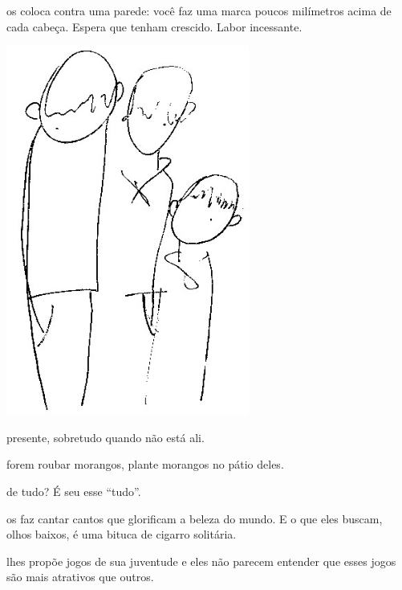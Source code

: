  os coloca contra uma parede: você faz uma marca poucos milímetros
acima de cada cabeça. Espera que tenham crescido. Labor incessante.

\pagebreak
\thispagestyle{empty}

\begin{vplace}[.50]
\begin{center}
\includegraphics[width=80mm]{./imgs/Image_6.jpg}
\end{center}
\end{vplace}

\pagebreak
\thispagestyle{empty}
\movetooddpage

 presente, sobretudo quando não está ali.



 forem roubar morangos, plante morangos no pátio deles.



 de tudo? É seu esse ``tudo''.



 os faz cantar cantos que glorificam a beleza do mundo. E o que eles
buscam, olhos baixos, é uma bituca de cigarro solitária.



 lhes propõe jogos de sua juventude e eles não parecem entender que
esses jogos são mais atrativos que outros.



